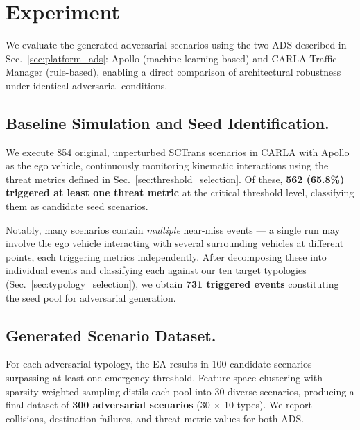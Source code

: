 \documentclass[sigconf,review,anonymous]{acmart}
\begin{document}






% 
\section{Experiment}

We evaluate the generated adversarial scenarios using the two ADS described in Sec.~\ref{sec:platform_ads}: Apollo (machine-learning-based) and CARLA Traffic Manager (rule-based), enabling a direct comparison of architectural robustness under identical adversarial conditions.

\subsection{Baseline Simulation and Seed Identification.}
We execute 854 original, unperturbed SCTrans scenarios in CARLA with Apollo as the ego vehicle, continuously monitoring kinematic interactions using the threat metrics defined in Sec.~\ref{sec:threshold_selection}. Of these, \textbf{562 (65.8\%) triggered at least one threat metric} at the critical threshold level, classifying them as candidate seed scenarios.

Notably, many scenarios contain \textit{multiple} near-miss events --- a single run may involve the ego vehicle interacting with several surrounding vehicles at different points, each triggering metrics independently. After decomposing these into individual events and classifying each against our ten target typologies (Sec.~\ref{sec:typology_selection}), we obtain \textbf{731 triggered events} constituting the seed pool for adversarial generation.

\subsection{Generated Scenario Dataset.}
For each adversarial typology, the EA results in 100 candidate scenarios surpassing at least one emergency threshold. Feature-space clustering with sparsity-weighted sampling distils each pool into 30 diverse scenarios, producing a final dataset of \textbf{300 adversarial scenarios} (30 $\times$ 10 types). We report collisions, destination failures, and threat metric values for both ADS.
\end{document}
